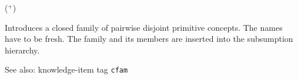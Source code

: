   ($^+$)

Introduces a closed family of pairwise disjoint primitive concepts.  The names
have to be fresh. The family and its members are inserted into the subsumption hierarchy.

See also: knowledge-item tag {\tt cfam}




